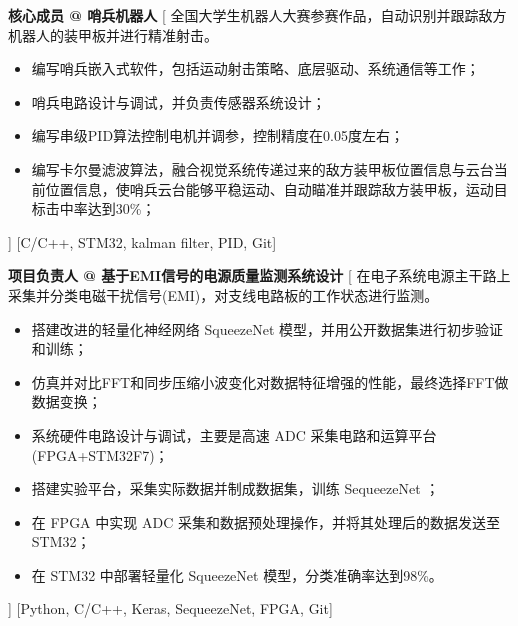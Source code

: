 \begin{experiences}
    {\textbf{核心成员 @ 哨兵机器人}}%
    [
    全国大学生机器人大赛参赛作品，自动识别并跟踪敌方机器人的装甲板并进行精准射击。
        \begin{itemize}
            \item {编写哨兵嵌入式软件，包括运动射击策略、底层驱动、系统通信等工作；}
            \item {哨兵电路设计与调试，并负责传感器系统设计；}
            \item {编写串级PID算法控制电机并调参，控制精度在0.05度左右；}
            \item {编写卡尔曼滤波算法，融合视觉系统传递过来的敌方装甲板位置信息与云台当前位置信息，使哨兵云台能够平稳运动、自动瞄准并跟踪敌方装甲板，运动目标击中率达到30\%；}
        \end{itemize}
    ]
    [C/C++, STM32, kalman filter, PID, Git]
    \separator{0.5ex}

    {\textbf{项目负责人 @ 基于EMI信号的电源质量监测系统设计 }}%
    [
    在电子系统电源主干路上采集并分类电磁干扰信号(EMI)，对支线电路板的工作状态进行监测。
        \begin{itemize}
            \item {搭建改进的轻量化神经网络 SqueezeNet 模型，并用公开数据集进行初步验证和训练；}
            \item {仿真并对比FFT和同步压缩小波变化对数据特征增强的性能，最终选择FFT做数据变换；}
            \item {系统硬件电路设计与调试，主要是高速 ADC 采集电路和运算平台(FPGA+STM32F7)；}
            \item {搭建实验平台，采集实际数据并制成数据集，训练 SequeezeNet ；}
            \item {在 FPGA 中实现 ADC 采集和数据预处理操作，并将其处理后的数据发送至STM32；}
            \item {在 STM32 中部署轻量化 SqueezeNet 模型，分类准确率达到98\%。}
        \end{itemize}]
    [Python, C/C++, Keras, SequeezeNet, FPGA, Git]
    
    
    
\end{experiences}